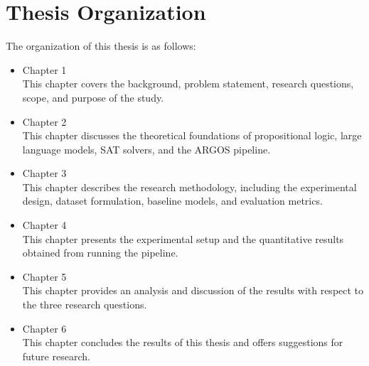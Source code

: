 \section{Thesis Organization}
\label{sec:sistematikaPenulisan}
The organization of this thesis is as follows:
\begin{itemize}
	\item Chapter 1 \babSatu \\
	    This chapter covers the background, problem statement, research questions, scope, and purpose of the study.
	\item Chapter 2 \babDua \\
	    This chapter discusses the theoretical foundations of propositional logic, large language models, SAT solvers, and the ARGOS pipeline.
	\item Chapter 3 \babTiga \\
	    This chapter describes the research methodology, including the experimental design, dataset formulation, baseline models, and evaluation metrics.
	\item Chapter 4 \babEmpat \\
	    This chapter presents the experimental setup and the quantitative results obtained from running the pipeline.
	\item Chapter 5 \babLima \\
	    This chapter provides an analysis and discussion of the results with respect to the three research questions.
	\item Chapter 6 \kesimpulan \\
	    This chapter concludes the results of this thesis and offers suggestions for future research.
\end{itemize}
